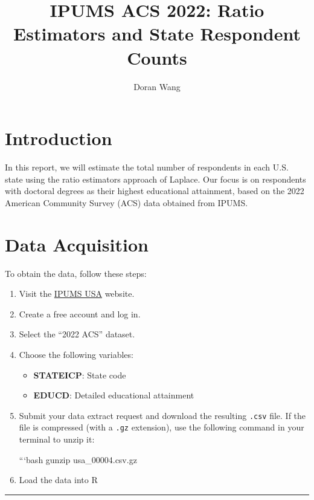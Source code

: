 \documentclass[
  letterpaper,
  DIV=11,
  numbers=noendperiod]{scrartcl}
\title{IPUMS ACS 2022: Ratio Estimators and State Respondent Counts}
\author{Doran Wang}
\date{}
\providecommand{\tightlist}{%
  \setlength{\itemsep}{0pt}\setlength{\parskip}{0pt}}\usepackage{longtable,booktabs,array}
\renewcommand*\contentsname{Table of contents}
\newcommand\contentsname{Table of contents}
\begin{document}
\maketitle

\renewcommand*\contentsname{Table of contents}
{
\hypersetup{linkcolor=}
\setcounter{tocdepth}{2}
\tableofcontents
}

\section{Introduction}\label{introduction}

In this report, we will estimate the total number of respondents in each
U.S. state using the ratio estimators approach of Laplace. Our focus is
on respondents with doctoral degrees as their highest educational
attainment, based on the 2022 American Community Survey (ACS) data
obtained from IPUMS.

\section{Data Acquisition}\label{data-acquisition}

To obtain the data, follow these steps:

\begin{enumerate}
\def\labelenumi{\arabic{enumi}.}
\item
  Visit the \href{https://usa.ipums.org/usa/}{IPUMS USA} website.
\item
  Create a free account and log in.
\item
  Select the ``2022 ACS'' dataset.
\item
  Choose the following variables:

  \begin{itemize}
  \tightlist
  \item
    \textbf{STATEICP}: State code
  \item
    \textbf{EDUCD}: Detailed educational attainment
  \end{itemize}
\item
  Submit your data extract request and download the resulting
  \texttt{.csv} file. If the file is compressed (with a \texttt{.gz}
  extension), use the following command in your terminal to unzip it:

  ```bash gunzip usa\_00004.csv.gz
\item
  Load the data into R
\end{enumerate}

\begin{center}\rule{0.5\linewidth}{0.5pt}\end{center}
\end{document}
